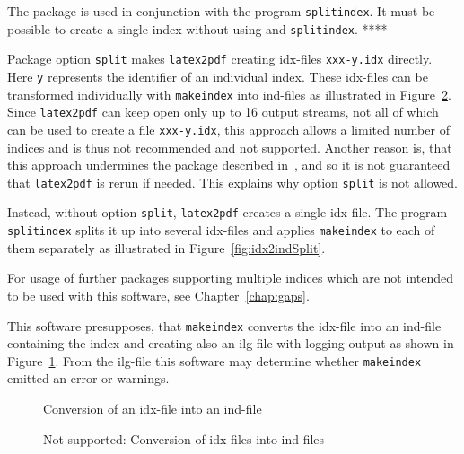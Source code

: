 The package  is used 
in conjunction with the program \texttt{splitindex}. 
It must be possible to create a single index 
without using  and \texttt{splitindex}. **** 

Package option \texttt{split} makes \texttt{latex2pdf} 
creating \gls{idx}-files \texttt{xxx-y.idx} directly. 
Here \texttt{y} represents the identifier of an individual index. 
These \gls{idx}-files can be transformed individually with \texttt{makeindex} 
into ind-files as illustrated in Figure~\ref{fig:idx2indMult}. 
Since \texttt{latex2pdf} can keep open only up to 16 output streams, 
not all of which can be used to create a file \texttt{xxx-y.idx}, 
this approach allows a limited number of indices 
and is thus not recommended and not supported. 
Another reason is, that this approach undermines 
the package  described in~\cite{RerunFChkP}, 
and so it is not guaranteed that \texttt{latex2pdf} is rerun if needed. 
This explains why option \texttt{split} is not allowed. 

Instead, without option \texttt{split}, 
\texttt{latex2pdf} creates a single \gls{idx}-file. 
The program \texttt{splitindex} splits it up into several \gls{idx}-files 
and applies \texttt{makeindex} to each of them separately 
as illustrated in Figure~\ref{fig:idx2indSplit}. 

For usage of further packages supporting multiple indices 
which are not intended to be used with this software, 
see Chapter~\ref{chap:gaps}. 

This software presupposes, that \texttt{makeindex} converts the \gls{idx}-file 
into an ind-file containing the index 
and creating also an ilg-file with logging output 
as shown in Figure~\ref{fig:idx2ind}. 
From the ilg-file this software may determine 
whether \texttt{makeindex} emitted an error or warnings. 

\begin{figure}[htb]
\centering
{}
\caption{\label{fig:idx2ind}Conversion of an \gls{idx}-file into an ind-file}
\end{figure}

\begin{figure}[htb]
\centering
{}
\caption{\label{fig:idx2indMult}
Not supported: Conversion of \gls{idx}-files into ind-files}
\end{figure}

